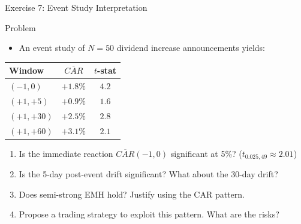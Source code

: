 \documentclass[9pt, aspectratio=169, t]{beamer}
\theoremstyle{definition}
\begin{document}
\begin{frame}{Exercise 7: Event Study Interpretation}
\begin{block}{Problem}
\begin{itemize}
\item An event study of $N = 50$ dividend increase announcements yields:
\end{itemize}
\begin{center}
{\small
\renewcommand{\arraystretch}{1.2}
\begin{tabular}{lcc}
\toprule
\textbf{Window} & \textbf{$\overline{CAR}$} & \textbf{$t$-stat} \\
\midrule
$(-1, 0)$ & $+1.8\%$ & $4.2$ \\
$(+1, +5)$ & $+0.9\%$ & $1.6$ \\
$(+1, +30)$ & $+2.5\%$ & $2.8$ \\
$(+1, +60)$ & $+3.1\%$ & $2.1$ \\
\bottomrule
\end{tabular}
}
\end{center}
\end{block}
\begin{enumerate}
    \item Is the immediate reaction $\overline{CAR}(-1,0)$ significant at 5\%? ($t_{0.025,49} \approx 2.01$)
    \item Is the 5-day post-event drift significant? What about the 30-day drift?
    \item Does semi-strong EMH hold? Justify using the CAR pattern.
    \item Propose a trading strategy to exploit this pattern. What are the risks?
\end{enumerate}
\end{frame}
\end{document}
